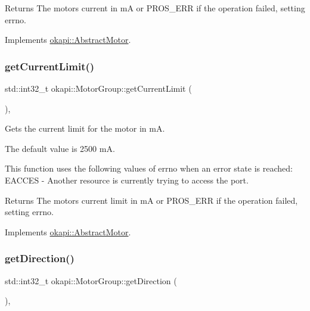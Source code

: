 \begin{DoxyReturn}{Returns}
The motor\textquotesingle{}s current in mA or {\ttfamily P\+R\+O\+S\+\_\+\+E\+RR} if the operation failed, setting errno. 
\end{DoxyReturn}


Implements \mbox{\hyperlink{classokapi_1_1AbstractMotor_a755ad2c78a4b36cc56eef1029a3aa217}{okapi\+::\+Abstract\+Motor}}.

\mbox{\label{classokapi_1_1MotorGroup_afe3f1ed73d64cc7204074d5cdb2a874e}} 
\subsubsection{\texorpdfstring{getCurrentLimit()}{getCurrentLimit()}}
{\footnotesize\ttfamily std\+::int32\+\_\+t okapi\+::\+Motor\+Group\+::get\+Current\+Limit (\begin{DoxyParamCaption}{ }\end{DoxyParamCaption})\hspace{0.3cm}{\ttfamily [override]}, {\ttfamily [virtual]}}

Gets the current limit for the motor in mA.

The default value is 2500 mA.

This function uses the following values of errno when an error state is reached\+: E\+A\+C\+C\+ES -\/ Another resource is currently trying to access the port.

\begin{DoxyReturn}{Returns}
The motor\textquotesingle{}s current limit in mA or {\ttfamily P\+R\+O\+S\+\_\+\+E\+RR} if the operation failed, setting errno. 
\end{DoxyReturn}


Implements \mbox{\hyperlink{classokapi_1_1AbstractMotor_ab83ef3319ffe1cb1d020e5a10127aab8}{okapi\+::\+Abstract\+Motor}}.

\mbox{\label{classokapi_1_1MotorGroup_a5466d52a245b10765945b91c0194da66}} 
\subsubsection{\texorpdfstring{getDirection()}{getDirection()}}
{\footnotesize\ttfamily std\+::int32\+\_\+t okapi\+::\+Motor\+Group\+::get\+Direction (\begin{DoxyParamCaption}{ }\end{DoxyParamCaption})\hspace{0.3cm}{\ttfamily [override]}, {\ttfamily [virtual]}}

